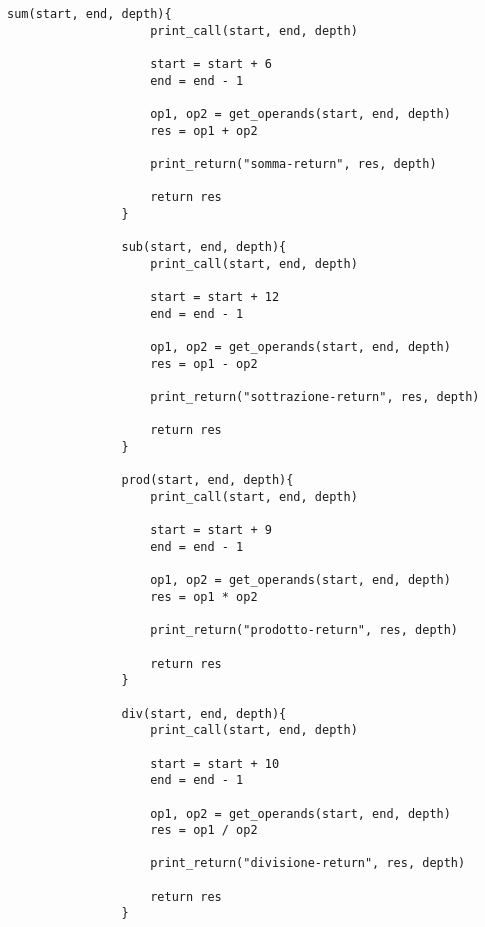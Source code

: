         \begin{center}
           	\begin{lstlisting}[language=pseudo, gobble=14]
                sum(start, end, depth){
                   	print_call(start, end, depth)
                   	
                   	start = start + 6
                   	end = end - 1
                   	
                   	op1, op2 = get_operands(start, end, depth)
                   	res = op1 + op2
                   	
                   	print_return("somma-return", res, depth)
                   	
                   	return res
                }
                
                sub(start, end, depth){
                   	print_call(start, end, depth)
                   	
                   	start = start + 12
                   	end = end - 1
                   	
                   	op1, op2 = get_operands(start, end, depth)
                   	res = op1 - op2
                   	
                   	print_return("sottrazione-return", res, depth)
                   	
                   	return res
                }
                
                prod(start, end, depth){
                   	print_call(start, end, depth)
                   	
                   	start = start + 9
                   	end = end - 1
                   	
                   	op1, op2 = get_operands(start, end, depth)
                   	res = op1 * op2
                   	
                   	print_return("prodotto-return", res, depth)
                   	
                   	return res
                }
                
                div(start, end, depth){
                   	print_call(start, end, depth)
                   	
                   	start = start + 10
                   	end = end - 1
                   	
                   	op1, op2 = get_operands(start, end, depth)
                   	res = op1 / op2
                   	
                   	print_return("divisione-return", res, depth)
                   	
                   	return res
                }
           	\end{lstlisting}
        \end{center}
        
